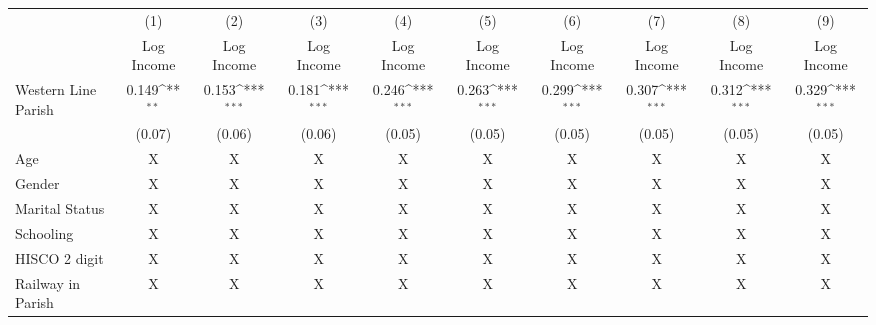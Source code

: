 {
\def\sym#1{\ifmmode^{#1}\else\(^{#1}\)\fi}
\begin{tabular}{l*{9}{c}}
\hline\hline
                    &\multicolumn{1}{c}{(1)}&\multicolumn{1}{c}{(2)}&\multicolumn{1}{c}{(3)}&\multicolumn{1}{c}{(4)}&\multicolumn{1}{c}{(5)}&\multicolumn{1}{c}{(6)}&\multicolumn{1}{c}{(7)}&\multicolumn{1}{c}{(8)}&\multicolumn{1}{c}{(9)}\\
                    &\multicolumn{1}{c}{Log Income}&\multicolumn{1}{c}{Log Income}&\multicolumn{1}{c}{Log Income}&\multicolumn{1}{c}{Log Income}&\multicolumn{1}{c}{Log Income}&\multicolumn{1}{c}{Log Income}&\multicolumn{1}{c}{Log Income}&\multicolumn{1}{c}{Log Income}&\multicolumn{1}{c}{Log Income}\\
\hline
Western Line Parish &       0.149\sym{**} &       0.153\sym{***}&       0.181\sym{***}&       0.246\sym{***}&       0.263\sym{***}&       0.299\sym{***}&       0.307\sym{***}&       0.312\sym{***}&       0.329\sym{***}\\
                    &      (0.07)         &      (0.06)         &      (0.06)         &      (0.05)         &      (0.05)         &      (0.05)         &      (0.05)         &      (0.05)         &      (0.05)         \\
Age                 &           X         &           X         &           X         &           X         &           X         &           X         &           X         &           X         &           X         \\
Gender              &           X         &           X         &           X         &           X         &           X         &           X         &           X         &           X         &           X         \\
Marital Status      &           X         &           X         &           X         &           X         &           X         &           X         &           X         &           X         &           X         \\
Schooling           &           X         &           X         &           X         &           X         &           X         &           X         &           X         &           X         &           X         \\
HISCO 2 digit       &           X         &           X         &           X         &           X         &           X         &           X         &           X         &           X         &           X         \\
Railway in Parish   &           X         &           X         &           X         &           X         &           X         &           X         &           X         &           X         &           X         \\

\end{tabular}}
